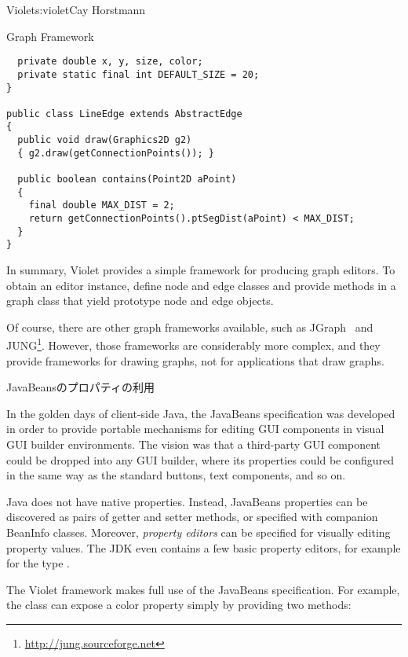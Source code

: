\begin{aosachapter}{Violet}{s:violet}{Cay Horstmann}
\begin{aosasect1}{Graph Framework}
\begin{verbatim}
  private double x, y, size, color;
  private static final int DEFAULT_SIZE = 20;
}

public class LineEdge extends AbstractEdge
{
  public void draw(Graphics2D g2)
  { g2.draw(getConnectionPoints()); }

  public boolean contains(Point2D aPoint)
  {
    final double MAX_DIST = 2;
    return getConnectionPoints().ptSegDist(aPoint) < MAX_DIST;
  }
}
\end{verbatim}


In summary, Violet provides a simple framework for producing graph
editors.  To obtain an editor instance, define node and edge classes
and provide methods in a graph class that yield prototype node and
edge objects.

Of course, there are other graph frameworks available, such as
JGraph~\cite{bib:alder:jgraph} and
JUNG\footnote{\url{http://jung.sourceforge.net}}. However, those
frameworks are considerably more complex, and they provide frameworks
for drawing graphs, not for applications that draw graphs.

\end{aosasect1}

\begin{aosasect1}{JavaBeansのプロパティの利用}

In the golden days of client-side Java, the JavaBeans specification
was developed in order to provide portable mechanisms for editing GUI
components in visual GUI builder environments. The vision was that a
third-party GUI component could be dropped into any GUI builder, where
its properties could be configured in the same way as the standard
buttons, text components, and so on.

Java does not have native properties. Instead, JavaBeans properties
can be discovered as pairs of getter and setter methods, or specified
with companion BeanInfo classes. Moreover, \emph{property editors} can
be specified for visually editing property values. The JDK even
contains a few basic property editors, for example for the type
.

The Violet framework makes full use of the 
JavaBeans specification. For example, the  class can
expose a color property simply by providing two methods:


\end{aosasect1}
\end{aosachapter}
